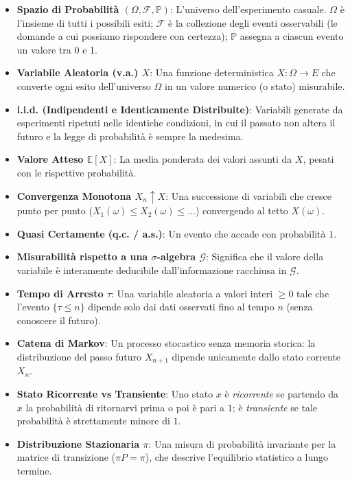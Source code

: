 \documentclass[11pt,a4paper]{report}
\begin{document}
\begin{itemize}[leftmargin=*, itemsep=6pt]
    \item \textbf{Spazio di Probabilità $(\Omega, \mathcal{F}, \mathbb{P})$}: L'universo dell'esperimento casuale. $\Omega$ è l'insieme di tutti i possibili esiti; $\mathcal{F}$ è la collezione degli eventi osservabili (le domande a cui possiamo rispondere con certezza); $\mathbb{P}$ assegna a ciascun evento un valore tra 0 e 1.
    \item \textbf{Variabile Aleatoria (v.a.) $X$}: Una funzione deterministica $X: \Omega \to E$ che converte ogni esito dell'universo $\Omega$ in un valore numerico (o stato) misurabile.
    \item \textbf{i.i.d. (Indipendenti e Identicamente Distribuite)}: Variabili generate da esperimenti ripetuti nelle identiche condizioni, in cui il passato non altera il futuro e la legge di probabilità è sempre la medesima.
    \item \textbf{Valore Atteso $\mathbb{E}[X]$}: La media ponderata dei valori assunti da $X$, pesati con le rispettive probabilità.
    \item \textbf{Convergenza Monotona $X_n \uparrow X$}: Una successione di variabili che cresce punto per punto ($X_1(\omega) \le X_2(\omega) \le \dots$) convergendo al tetto $X(\omega)$.
    \item \textbf{Quasi Certamente (q.c. / a.s.)}: Un evento che accade con probabilità $1$.
    \item \textbf{Misurabilità rispetto a una $\sigma$-algebra $\mathcal{G}$}: Significa che il valore della variabile è interamente deducibile dall'informazione racchiusa in $\mathcal{G}$.
    \item \textbf{Tempo di Arresto $\tau$}: Una variabile aleatoria a valori interi $\ge 0$ tale che l'evento $\{\tau \le n\}$ dipende solo dai dati osservati fino al tempo $n$ (senza conoscere il futuro).
    \item \textbf{Catena di Markov}: Un processo stocastico senza memoria storica: la distribuzione del passo futuro $X_{n+1}$ dipende unicamente dallo stato corrente $X_n$.
    \item \textbf{Stato Ricorrente vs Transiente}: Uno stato $x$ è \emph{ricorrente} se partendo da $x$ la probabilità di ritornarvi prima o poi è pari a $1$; è \emph{transiente} se tale probabilità è strettamente minore di $1$.
    \item \textbf{Distribuzione Stazionaria $\pi$}: Una misura di probabilità invariante per la matrice di transizione ($\pi P = \pi$), che descrive l'equilibrio statistico a lungo termine.
\end{itemize}
\end{document}
